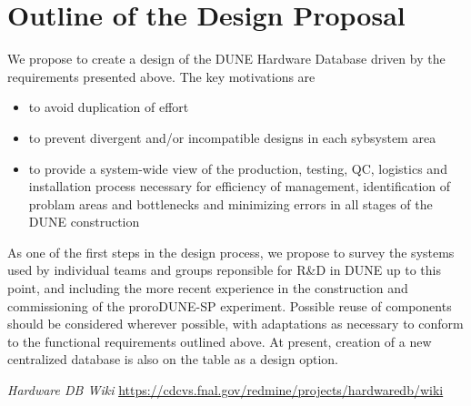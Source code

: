 \documentclass[pdftex,12pt,letter]{article}
\begin{document}
\section{Outline of the Design Proposal}

We propose to create a design of the DUNE Hardware Database driven by the requirements presented above. The key
motivations are

\begin{itemize}

\item to avoid duplication of effort

\item to prevent divergent and/or incompatible designs in each sybsystem area

\item to provide a system-wide view of the production, testing, QC, logistics and installation process necessary
for efficiency of management, identification of problam areas and bottlenecks and minimizing errors in all stages
of the DUNE construction


\end{itemize}

\noindent As one of the first steps in the design process, we propose to survey the systems used by individual
teams and groups reponsible for R\&D in  DUNE up to this point, and including the more recent experience in
the construction and commissioning of the proroDUNE-SP experiment. Possible reuse of components should
be considered wherever possible, with adaptations as necessary to conform to the functional requirements
outlined above. At present, creation of a new centralized database is also on the table as a design option.











\begin{thebibliography}{1}

{\textit{Hardware DB Wiki} \url{https://cdcvs.fnal.gov/redmine/projects/hardwaredb/wiki}}

\end{thebibliography}
\end{document}

